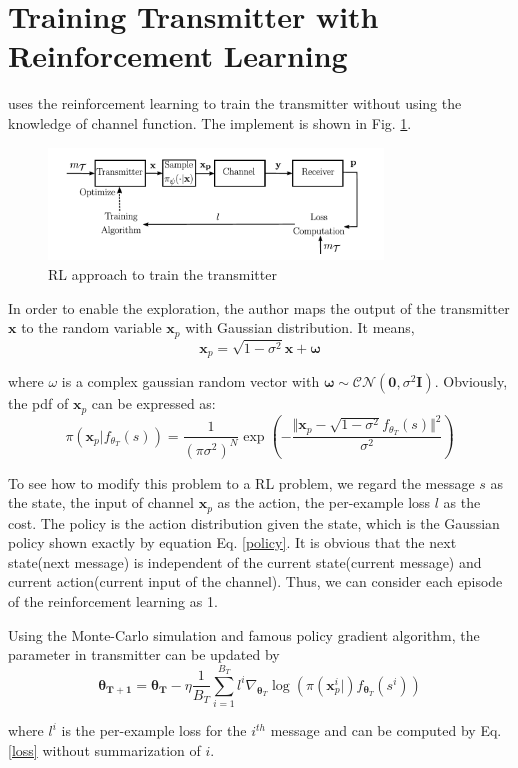 \documentclass[12pt,a4paper]{article}
\begin{document}
	\section{Training Transmitter with Reinforcement Learning}
	\noindent
	\par \citep{8645416} uses the reinforcement learning to train the transmitter without using the knowledge of channel function. The implement is shown in Fig. \ref{RL}. 
	\begin{figure}[h] \label{RL}
		\centering
		\includegraphics[width=3.5in]{RL.png}
		\caption{RL approach to train the transmitter}
	\end{figure}
	\par In order to enable the exploration, the author maps the output of the transmitter $\bm{x}$ to the random variable $\bm{x}_p$ with Gaussian distribution. It means,
	\begin{equation}
		\bm{x}_p=\sqrt{1-\sigma^2}\bm{x}+\bm{\omega}
	\end{equation}
	\par where $\omega$ is a complex gaussian random vector with $\bm{\omega}\sim\mathcal{CN}(\bm{0},\sigma^2\mathbf{I})$. Obviously, the pdf of $\bm{x}_p$ can be expressed as:
	\begin{equation} \label{policy}
		\pi(\bm{x}_p\vert f_{\theta_T}(s))=\frac{1}{(\pi\sigma^2)^N}\exp(-\frac{\Vert\bm{x}_p-\sqrt{1-\sigma^2}f_{\theta_T}(s)\Vert^2}{\sigma^2})
	\end{equation}
	\par To see how to modify this problem to a RL problem, we regard the message $s$ as the state, the input of channel $\bm{x}_p$ as the action, the per-example loss $l$ as the cost. The policy is the action distribution given the state, which is the Gaussian policy shown exactly by equation Eq. \eqref{policy}. It is obvious that the next state(next message) is independent of the current state(current message) and current action(current input of the channel). Thus, we can consider each episode of the reinforcement learning as 1. 
	\par Using the Monte-Carlo simulation and famous policy gradient algorithm, the parameter in transmitter can be updated by
	\begin{equation}
		\bm{\theta_{T+1}}=\bm{\theta_T}-\eta\frac{1}{B_T}\sum_{i=1}^{B_T}l^{i}\nabla_{\bm{\theta}_T}\log(\pi(\bm{x}_p^{i}\vert)f_{\bm{\theta}_T}(s^{i}))
	\end{equation}
	\par where $l^{i}$ is the per-example loss for the $i^{th}$ message and can be computed by Eq. \eqref{loss} without summarization of $i$.
\end{document}
